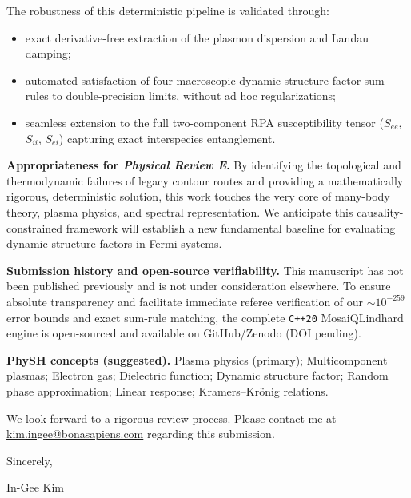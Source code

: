 \documentclass[11pt]{article}
\begin{document}
The robustness of this deterministic pipeline is validated through:
\begin{itemize}
\item exact derivative-free extraction of the plasmon dispersion and Landau damping;
\item automated satisfaction of four macroscopic dynamic structure factor sum rules to double-precision limits, without ad hoc regularizations;
\item seamless extension to the full two-component RPA susceptibility tensor ($S_{ee}$, $S_{ii}$, $S_{ei}$) capturing exact interspecies entanglement.
\end{itemize}

\textbf{Appropriateness for \textit{Physical Review E}.}
By identifying the topological and thermodynamic failures of legacy contour routes and providing a mathematically rigorous, deterministic solution, this work touches the very core of many-body theory, plasma physics, and spectral representation.
We anticipate this causality-constrained framework will establish a new fundamental baseline for evaluating dynamic structure factors in Fermi systems.

\textbf{Submission history and open-source verifiability.}
This manuscript has not been published previously and is not under consideration elsewhere.
To ensure absolute transparency and facilitate immediate referee verification of our $\sim 10^{-259}$ error bounds and exact sum-rule matching, the complete \texttt{C++20} MosaiQ\-Lindhard engine is open-sourced and available on GitHub/Zenodo (DOI pending).

\textbf{PhySH concepts (suggested).}
Plasma physics (primary); Multicomponent plasmas; Electron gas; Dielectric function; Dynamic structure factor; Random phase approximation; Linear response; Kramers--Kr\"onig relations.

We look forward to a rigorous review process.
Please contact me at \href{mailto:kim.ingee@bonasapiens.com}{kim.ingee@bonasapiens.com} regarding this submission.

\vspace{1em}
\noindent
Sincerely,

\vspace{1.5em}
\noindent
In-Gee Kim
\end{document}
